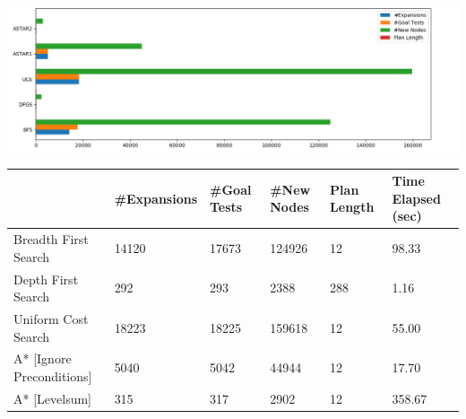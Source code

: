 \documentclass{article}
\begin{document}
\begin{center}
  \includegraphics[width=\textwidth]{problem3.jpg}

  \begin{tabular}{ | l | l | l | l | l | l | }
    \hline
                                & #Expansions & #Goal Tests & #New Nodes  & Plan Length & Time Elapsed (sec) \\ \hline \hline
    Breadth First Search        & 14120       & 17673       & 124926      & 12    & 98.33   \\ \hline
    Depth First Search          & 292         & 293         & 2388        & 288   & 1.16    \\ \hline
    Uniform Cost Search         & 18223       & 18225       & 159618      & 12    & 55.00   \\ \hline
    A* [Ignore Preconditions]   & 5040        & 5042        & 44944       & 12    & 17.70   \\ \hline
    A* [Levelsum]               & 315         & 317         & 2902        & 12    & 358.67  \\ \hline
  \end{tabular}
\end{center} \\ \\
\end{document}
